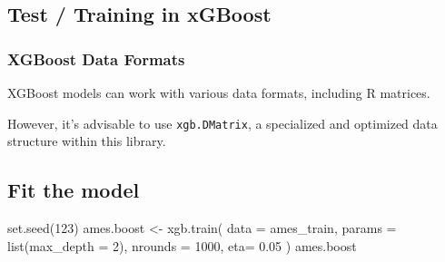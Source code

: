 \documentclass[
  letterpaper,
  DIV=11,
  numbers=noendperiod,
  oneside]{scrartcl}
\newenvironment{Shaded}{\begin{snugshade}}{\end{snugshade}}
\newcommand{\AttributeTok}[1]{\textcolor[rgb]{0.40,0.45,0.13}{#1}}
\newcommand{\DecValTok}[1]{\textcolor[rgb]{0.68,0.00,0.00}{#1}}
\newcommand{\FloatTok}[1]{\textcolor[rgb]{0.68,0.00,0.00}{#1}}
\newcommand{\FunctionTok}[1]{\textcolor[rgb]{0.28,0.35,0.67}{#1}}
\newcommand{\NormalTok}[1]{\textcolor[rgb]{0.00,0.23,0.31}{#1}}
\newcommand{\OtherTok}[1]{\textcolor[rgb]{0.00,0.23,0.31}{#1}}
\newcommand{\SpecialCharTok}[1]{\textcolor[rgb]{0.37,0.37,0.37}{#1}}
\begin{document}
\subsection{Test / Training in xGBoost}\label{test-training-in-xgboost}

\subsubsection{XGBoost Data Formats}\label{xgboost-data-formats}

XGBoost models can work with various data formats, including R matrices.

However, it's advisable to use \texttt{xgb.DMatrix}, a specialized and
optimized data structure within this library.

\begin{Shaded}
\end{Shaded}

\subsection{Fit the model}\label{fit-the-model}

\begin{Shaded}
\begin{Highlighting}[]
\FunctionTok{set.seed}\NormalTok{(}\DecValTok{123}\NormalTok{)}
\NormalTok{ames.boost }\OtherTok{\textless{}{-}} \FunctionTok{xgb.train}\NormalTok{(}
            \AttributeTok{data    =}\NormalTok{ ames\_train,}
            \AttributeTok{params  =} \FunctionTok{list}\NormalTok{(}\AttributeTok{max\_depth =} \DecValTok{2}\NormalTok{),}
            \AttributeTok{nrounds =} \DecValTok{1000}\NormalTok{,}
            \AttributeTok{eta=} \FloatTok{0.05}
\NormalTok{          )}
\NormalTok{ames.boost}
\end{Highlighting}
\end{Shaded}
\end{document}
